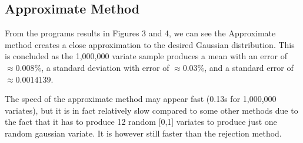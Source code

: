 \documentclass{article}
\begin{document}
\begin{figure}[htb]
\end{figure}





\subsection{Approximate Method}

From the programs results in Figures 3 and 4, we can see the Approximate method creates a close approximation to the desired Gaussian distribution. This is concluded as the 1,000,000 variate sample produces a mean with an error of $\approx0.008\%$, a standard deviation with error of $\approx0.03\%$, and a standard error of $\approx0.0014139$.

The speed of the approximate method may appear fast (0.13s for 1,000,000 variates), but it is in fact relatively slow compared to some other methods due to the fact that it has to produce 12 random [0,1] variates to produce just one random gaussian variate. It is however still faster than the rejection method.

\begin{figure}[htb]
\end{figure}
\end{document}
